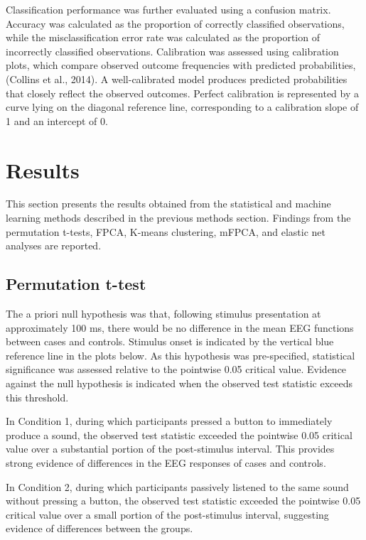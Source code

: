 \documentclass{article}
\begin{document}
Classification performance was further evaluated using a confusion
matrix. Accuracy was calculated as the proportion of correctly
classified observations, while the misclassification error rate was
calculated as the proportion of incorrectly classified observations.
Calibration was assessed using calibration plots, which compare observed
outcome frequencies with predicted probabilities, (Collins et al.,
2014). A well-calibrated model produces predicted probabilities that
closely reflect the observed outcomes. Perfect calibration is
represented by a curve lying on the diagonal reference line,
corresponding to a calibration slope of 1 and an intercept of 0.

\section{Results}\label{results}

\label{sec:results}

This section presents the results obtained from the statistical and
machine learning methods described in the previous methods section.
Findings from the permutation t-tests, FPCA, K-means clustering, mFPCA,
and elastic net analyses are reported.

\subsection{Permutation t-test}\label{permutation-t-test}

The a priori null hypothesis was that, following stimulus presentation
at approximately 100 ms, there would be no difference in the mean EEG
functions between cases and controls. Stimulus onset is indicated by the
vertical blue reference line in the plots below. As this hypothesis was
pre-specified, statistical significance was assessed relative to the
pointwise 0.05 critical value. Evidence against the null hypothesis is
indicated when the observed test statistic exceeds this threshold.

In Condition 1, during which participants pressed a button to
immediately produce a sound, the observed test statistic exceeded the
pointwise 0.05 critical value over a substantial portion of the
post-stimulus interval. This provides strong evidence of differences in
the EEG responses of cases and controls.

In Condition 2, during which participants passively listened to the same
sound without pressing a button, the observed test statistic exceeded
the pointwise 0.05 critical value over a small portion of the
post-stimulus interval, suggesting evidence of differences between the
groups.
\end{document}
